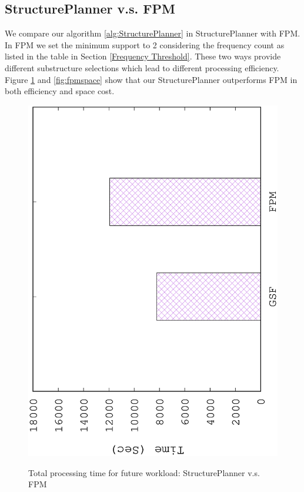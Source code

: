 \subsection{StructurePlanner v.s. FPM}
\label{StructurePlanner v.s. FPM}
We compare our algorithm \ref{alg:StructurePlanner} in StructurePlanner with FPM. In FPM we set the minimum support to 2 considering the frequency count as listed in the table in Section \ref{Frequency Threshold}. These two ways provide different substructure selections which lead to different processing efficiency. Figure \ref{fig:fpm} and \ref{fig:fpmspace} show that our StructurePlanner outperforms FPM in both efficiency and space cost.

\begin{figure}[H]
	\centering
	\includegraphics[scale=0.5, angle=270]{plot/fpm.eps}
	\label{fig:fpm}
	\caption{Total processing time for future workload: StructurePlanner v.s. FPM}
\end{figure}

